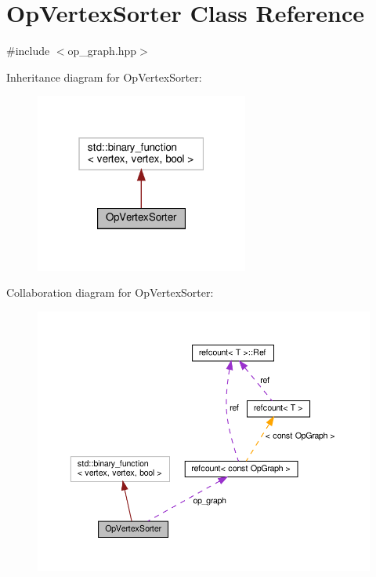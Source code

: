 \hypertarget{classOpVertexSorter}{}\section{Op\+Vertex\+Sorter Class Reference}
\label{classOpVertexSorter}


{\ttfamily \#include $<$op\+\_\+graph.\+hpp$>$}



Inheritance diagram for Op\+Vertex\+Sorter\+:
\nopagebreak
\begin{figure}[H]
\begin{center}
\leavevmode
\includegraphics[width=199pt]{d0/dc3/classOpVertexSorter__inherit__graph}
\end{center}
\end{figure}


Collaboration diagram for Op\+Vertex\+Sorter\+:
\nopagebreak
\begin{figure}[H]
\begin{center}
\leavevmode
\includegraphics[width=350pt]{dc/d58/classOpVertexSorter__coll__graph}
\end{center}
\end{figure}

